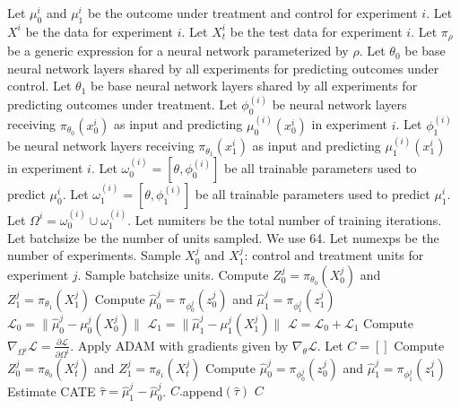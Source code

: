\newpage
\newpage 
\begin{algorithm}[H]
	\caption{Multi-Head T-learner}
	\label{alg:multi-t}
	\begin{algorithmic}[1]
		\State Let $\mu^{i}_0$ and $\mu^{i}_1$ be the outcome under treatment and control for experiment $i$. 
		\State Let $X^i$ be the data for experiment $i$. Let $X^i_t$ be the test data for experiment $i$. 
		\State Let $\pi_\rho$ be a generic expression for a neural network parameterized by $\rho$. 
		\State Let $\theta_0$ be base neural network layers shared by all experiments for predicting outcomes under control.
		\State Let $\theta_1$ be base neural network layers shared by all experiments for predicting outcomes under treatment.
		\State Let $\phi_0^{(i)}$  be neural network layers receiving $\pi_{\theta_0}(x^i_0)$ as input and predicting $\mu_0^{(i)}(x^i_0)$ in experiment $i$.
		\State Let $\phi_1^{(i)}$  be neural network layers receiving $\pi_{\theta_1}(x^i_1)$ as input and predicting $\mu_1^{(i)}(x^i_1)$ in experiment $i$.
		\State Let $\omega_0^{(i)} = \left[\theta, \phi_0^{(i)} \right]$ be all trainable parameters used to predict $\mu_0^i$.
		\State Let $\omega_1^{(i)} = \left[\theta, \phi_1^{(i)} \right]$ be all trainable parameters used to predict $\mu_1^i$.
		\State Let $\Omega^i = \omega_0^{(i)} \cup \omega_1^{(i)}$. 
		\State Let numiters be the total number of training iterations.
		\State Let batchsize be the number of units sampled. We use 64. 
		\State Let numexps be the number of experiments. 
		\State Sample $X^j_0$ and $X^j_1$: control and treatment units for experiment $j$. Sample batchsize units.  
		\State Compute $Z_0^j = \pi_{\theta_0}(X^j_0)$ and $Z_1^j = \pi_{\theta_1}(X^j_1)$
		\State Compute $\hat{\mu}_0^j = \pi_{\phi_0^j} (z_0^j)$ and $\hat{\mu}_1^j = \pi_{\phi_1^j} (z_1^j)$
		\State $\mathcal{L}_0= \| \hat{\mu}_0^j - \mu_0^j(X^j_0) \| $
		\State $\mathcal{L}_1 = \| \hat{\mu}_1^j - \mu_1^j(X^j_1) \| $
		\State $\mathcal{L} = \mathcal{L}_0 + \mathcal{L}_1$
		\State Compute $\nabla_{\Omega^i} \mathcal{L} = \frac{\partial \mathcal{L}}{\partial \Omega^i}$.
		\State Apply ADAM with gradients given by $\nabla_{\theta} \mathcal{L}$. 
		\EndFor
		\EndFor
		\State Let $C = []$
		\State Compute $Z_0^j = \pi_{\theta_0}(X^j_t)$ and $Z_1^j = \pi_{\theta_1}(X^j_t)$
		\State Compute $\hat{\mu}_0^j = \pi_{\phi_0^j} (z_0^j)$ and $\hat{\mu}_1^j = \pi_{\phi_1^j} (z_1^j)$
		\State Estimate CATE $\hat{\tau} = \hat{\mu}_1^j - \hat{\mu}_0^j$. 
		\State $C.$append$(\hat{\tau})$
		\EndFor
		 $C$ 
	\end{algorithmic}
\end{algorithm}


